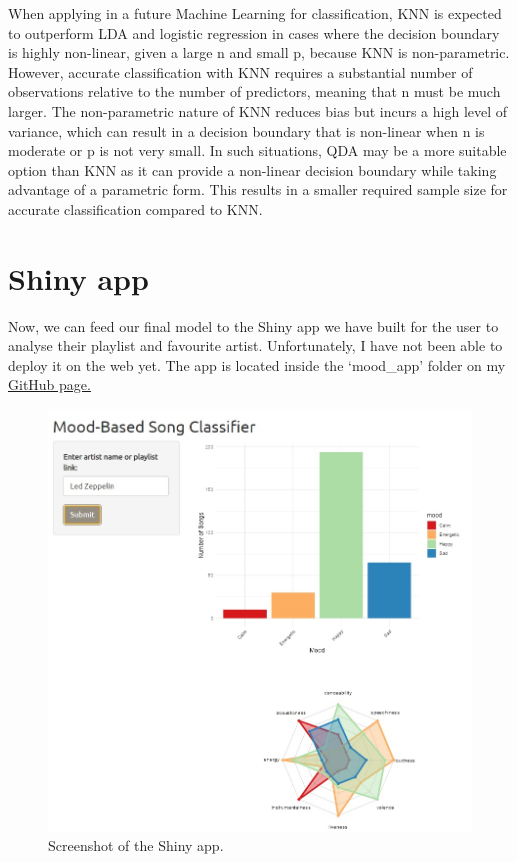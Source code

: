 \documentclass[11pt,]{article}
\begin{document}
When applying in a future Machine Learning for classification, KNN is
expected to outperform LDA and logistic regression in cases where the
decision boundary is highly non-linear, given a large n and small p,
because KNN is non-parametric. However, accurate classification with KNN
requires a substantial number of observations relative to the number of
predictors, meaning that n must be much larger. The non-parametric
nature of KNN reduces bias but incurs a high level of variance, which
can result in a decision boundary that is non-linear when n is moderate
or p is not very small. In such situations, QDA may be a more suitable
option than KNN as it can provide a non-linear decision boundary while
taking advantage of a parametric form. This results in a smaller
required sample size for accurate classification compared to KNN.

\hypertarget{shiny-app}{%
\section{Shiny app}\label{shiny-app}}

Now, we can feed our final model to the Shiny app we have built for the
user to analyse their playlist and favourite artist. Unfortunately, I
have not been able to deploy it on the web yet. The app is located
inside the `mood\_app' folder on my
\href{https://github.com/AlvaroNovillo/music_mood}{GitHub page.}

\begin{figure}[H]

{\centering \includegraphics[width=0.5\linewidth,]{figs/shiny} 

}

\caption{Screenshot of the Shiny app.}\label{fig:shiny}
\end{figure}

\setlength{\parindent}{-0.2in}
\setlength{\leftskip}{0.2in}
\setlength{\parskip}{8pt}
\vspace*{-0.2in}

\noindent





\newpage
\singlespacing

\end{document}
